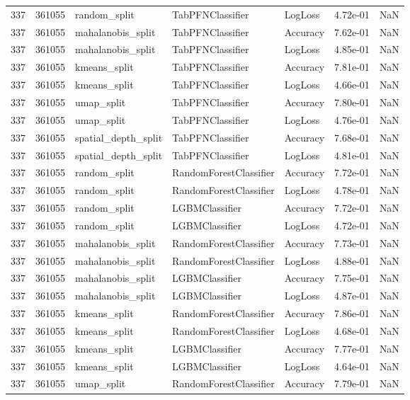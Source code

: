 \begin{tabular}{rrlllrr}
337 & 361055 & random\_split & TabPFNClassifier & LogLoss & 4.72e-01 & NaN \\
337 & 361055 & mahalanobis\_split & TabPFNClassifier & Accuracy & 7.62e-01 & NaN \\
337 & 361055 & mahalanobis\_split & TabPFNClassifier & LogLoss & 4.85e-01 & NaN \\
337 & 361055 & kmeans\_split & TabPFNClassifier & Accuracy & 7.81e-01 & NaN \\
337 & 361055 & kmeans\_split & TabPFNClassifier & LogLoss & 4.66e-01 & NaN \\
337 & 361055 & umap\_split & TabPFNClassifier & Accuracy & 7.80e-01 & NaN \\
337 & 361055 & umap\_split & TabPFNClassifier & LogLoss & 4.76e-01 & NaN \\
337 & 361055 & spatial\_depth\_split & TabPFNClassifier & Accuracy & 7.68e-01 & NaN \\
337 & 361055 & spatial\_depth\_split & TabPFNClassifier & LogLoss & 4.81e-01 & NaN \\
337 & 361055 & random\_split & RandomForestClassifier & Accuracy & 7.72e-01 & NaN \\
337 & 361055 & random\_split & RandomForestClassifier & LogLoss & 4.78e-01 & NaN \\
337 & 361055 & random\_split & LGBMClassifier & Accuracy & 7.72e-01 & NaN \\
337 & 361055 & random\_split & LGBMClassifier & LogLoss & 4.72e-01 & NaN \\
337 & 361055 & mahalanobis\_split & RandomForestClassifier & Accuracy & 7.73e-01 & NaN \\
337 & 361055 & mahalanobis\_split & RandomForestClassifier & LogLoss & 4.88e-01 & NaN \\
337 & 361055 & mahalanobis\_split & LGBMClassifier & Accuracy & 7.75e-01 & NaN \\
337 & 361055 & mahalanobis\_split & LGBMClassifier & LogLoss & 4.87e-01 & NaN \\
337 & 361055 & kmeans\_split & RandomForestClassifier & Accuracy & 7.86e-01 & NaN \\
337 & 361055 & kmeans\_split & RandomForestClassifier & LogLoss & 4.68e-01 & NaN \\
337 & 361055 & kmeans\_split & LGBMClassifier & Accuracy & 7.77e-01 & NaN \\
337 & 361055 & kmeans\_split & LGBMClassifier & LogLoss & 4.64e-01 & NaN \\
337 & 361055 & umap\_split & RandomForestClassifier & Accuracy & 7.79e-01 & NaN \\

\end{tabular}
